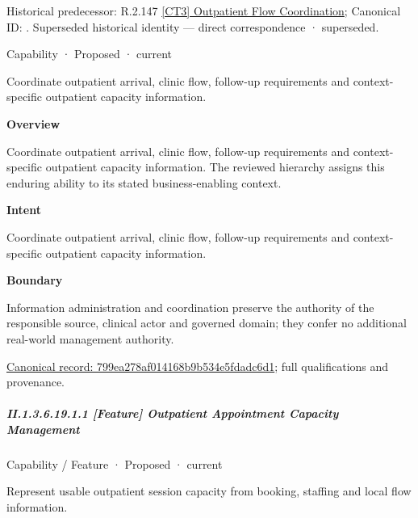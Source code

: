 {\small Historical predecessor: R.2.147 \hyperref[element:e6c59c7b72fe44169a5fdfd08a5e91c4]{[CT3] Outpatient Flow Coordination}; Canonical ID: \texttt{}. Superseded historical identity — direct correspondence · superseded.}\par
\label{element:799ea278af014168b9b534e5fdadc6d1}
{\small Capability · Proposed · current}\par

Coordinate outpatient arrival, clinic flow, follow-up requirements and context-specific outpatient capacity information.



\textbf{Overview}



Coordinate outpatient arrival, clinic flow, follow-up requirements and context-specific outpatient capacity information. The reviewed hierarchy assigns this enduring ability to its stated business-enabling context.



\textbf{Intent}



Coordinate outpatient arrival, clinic flow, follow-up requirements and context-specific outpatient capacity information.



\textbf{Boundary}



Information administration and coordination preserve the authority of the responsible source, clinical actor and governed domain; they confer no additional real-world management authority.


{\footnotesize \href{../../../../../../../continuum/strategy/capability/799ea278af014168b9b534e5fdadc6d1.md}{Canonical record: 799ea278af014168b9b534e5fdadc6d1}; full qualifications and provenance.}\par
\subparagraph*{II.1.3.6.19.1.1 [Feature] Outpatient Appointment Capacity Management}
\label{navigation:II.1.3.6.19.1.1}

\label{element:3c4f8b0fc23044cbbac32602e1272680}
{\small Capability / Feature · Proposed · current}\par

Represent usable outpatient session capacity from booking, staffing and local flow information.



